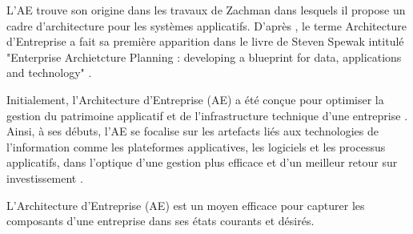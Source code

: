 L'AE trouve son origine dans les travaux de Zachman \cite{zachman1987framework} 
dans lesquels il propose un cadre d'architecture pour les systèmes applicatifs.
D'après \cite{bernard2012introduction}, le terme Architecture d'Entreprise a 
fait sa première apparition dans le livre de Steven Spewak intitulé "Enterprise 
Archietcture Planning : developing a blueprint for data, applications and 
technology" \cite{spewak1993enterprise}.

Initialement, l'Architecture d'Entreprise (AE) a été conçue pour optimiser la 
gestion du patrimoine applicatif et de l'infrastructure technique d'une 
entreprise \cite{kappelman2008enterprise}. Ainsi, à  ses débuts, l'AE se 
focalise sur les artefacts liés aux technologies de l'information comme les 
plateformes applicatives, les logiciels et les processus applicatifs, dans 
l'optique d'une gestion plus efficace et d'un meilleur retour sur investissement 
\cite{winter2006essential}. 




L'Architecture d'Entreprise (AE) est un moyen efficace pour capturer les 
composants d'une entreprise dans ses états courants et désirés.  

